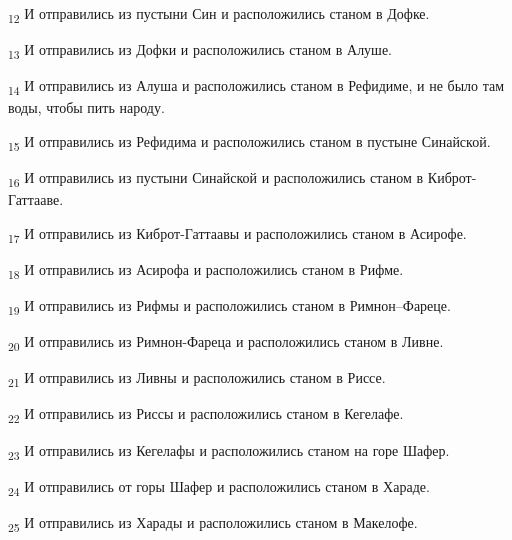 \begin{tcolorbox}
\textsubscript{12} И отправились из пустыни Син и расположились станом в Дофке.
\end{tcolorbox}
\begin{tcolorbox}
\textsubscript{13} И отправились из Дофки и расположились станом в Алуше.
\end{tcolorbox}
\begin{tcolorbox}
\textsubscript{14} И отправились из Алуша и расположились станом в Рефидиме, и не было там воды, чтобы пить народу.
\end{tcolorbox}
\begin{tcolorbox}
\textsubscript{15} И отправились из Рефидима и расположились станом в пустыне Синайской.
\end{tcolorbox}
\begin{tcolorbox}
\textsubscript{16} И отправились из пустыни Синайской и расположились станом в Киброт-Гаттааве.
\end{tcolorbox}
\begin{tcolorbox}
\textsubscript{17} И отправились из Киброт-Гаттаавы и расположились станом в Асирофе.
\end{tcolorbox}
\begin{tcolorbox}
\textsubscript{18} И отправились из Асирофа и расположились станом в Рифме.
\end{tcolorbox}
\begin{tcolorbox}
\textsubscript{19} И отправились из Рифмы и расположились станом в Римнон--Фареце.
\end{tcolorbox}
\begin{tcolorbox}
\textsubscript{20} И отправились из Римнон-Фареца и расположились станом в Ливне.
\end{tcolorbox}
\begin{tcolorbox}
\textsubscript{21} И отправились из Ливны и расположились станом в Риссе.
\end{tcolorbox}
\begin{tcolorbox}
\textsubscript{22} И отправились из Риссы и расположились станом в Кегелафе.
\end{tcolorbox}
\begin{tcolorbox}
\textsubscript{23} И отправились из Кегелафы и расположились станом на горе Шафер.
\end{tcolorbox}
\begin{tcolorbox}
\textsubscript{24} И отправились от горы Шафер и расположились станом в Хараде.
\end{tcolorbox}
\begin{tcolorbox}
\textsubscript{25} И отправились из Харады и расположились станом в Макелофе.
\end{tcolorbox}
